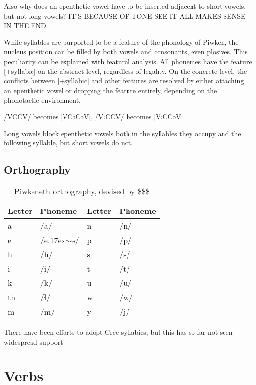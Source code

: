 \documentclass[smallroyalvopaper,9pt]{memoir}
\newcommand{\lang}{Piwkeneth}
\newcommand{\langeng}{Piwken}
\newcommand{\longv}[1]{#1ː}
\newcommand{\ttilde}{\raise.17ex\hbox{$\scriptstyle\sim$}}
\begin{document}
Also why does an epenthetic vowel have to be inserted adjacent to short vowels, but not long vowels? IT'S BECAUSE OF TONE SEE IT ALL MAKES SENSE IN THE END

While syllables are purported to be a feature of the phonology of \langeng{}, the nucleus position can be filled by both vowels and consonants, even plosives. This peculiarity can be explained with featural analysis. All phonemes have the feature [+syllabic] on the abstract level, regardless of legality. On the concrete level, the conflicts between [+syllabic] and other features are resolved by either attaching an epenthetic vowel or dropping the feature entirely, depending on the phonotactic environment. 

/VCCV/ becomes [VCəCəV], /\longv{V}CCV/ becomes [\longv{V}CCəV]

Long vowels block epenthetic vowels both in the syllables they occupy and the following syllable, but short vowels do not. 

\newpage

\section{Orthography}

\begin{table}[ht]
    \centering
    \begin{tabular}{llll}
        \toprule
        Letter & Phoneme & Letter & Phoneme\\
        \midrule
        a & /a/ & n & /n/ \\
        e & /e\ttilde{}ə/ & p & /p/ \\
        h & /h/ & s & /s/ \\
        i & /i/ & t & /t/ \\
        k & /k/ & u & /u/ \\
        th& /ɬ/ & w & /w/ \\
        m & /m/ & y & /j/ \\
        \bottomrule
    \end{tabular}
    \caption{\lang{} orthography, devised by \$\$\$}
\end{table}

There have been efforts to adopt Cree syllabics, but this has so far not seen widespread support.

\chapter{Verbs} 
\end{document}
